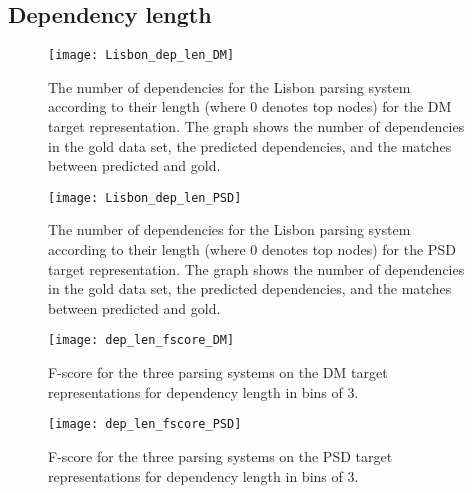 
\subsection{Dependency length}

\begin{figure}[h]
    \centering
    \begin{minipage}{0.8\textwidth}
        \centering
        \texttt{[image: Lisbon\_dep\_len\_DM]}
    \end{minipage}\hfill
    \caption{The number of dependencies for the Lisbon parsing system according to their length (where 0 denotes top nodes) for the DM target representation. The graph shows the number of dependencies in the gold data set, the predicted dependencies, and the matches between predicted and gold.}
    \label{fig:Lisbon_dep_len_DM}
\end{figure}

\begin{figure}[h]
    \centering
    \begin{minipage}{0.8\textwidth}
        \centering
        \texttt{[image: Lisbon\_dep\_len\_PSD]}
    \end{minipage}
    \caption{The number of dependencies for the Lisbon parsing system according to their length (where 0 denotes top nodes) for the PSD target representation. The graph shows the number of dependencies in the gold data set, the predicted dependencies, and the matches between predicted and gold.}
    \label{fig:Lisbon_dep_len_PSD}
\end{figure}

\begin{figure}[h]
    \centering
    \begin{minipage}{0.8\textwidth}
        \centering
        \texttt{[image: dep\_len\_fscore\_DM]}
    \end{minipage}\hfill
    \caption{F-score for the three parsing systems on the DM target representations for dependency length in bins of 3.}
    \label{fig:dep_len_fscore_DM}
\end{figure}

\begin{figure}[h]
    \centering
    \begin{minipage}{0.8\textwidth}
        \centering
        \texttt{[image: dep\_len\_fscore\_PSD]}
    \end{minipage}
    \caption{F-score for the three parsing systems on the PSD target representations for dependency length in bins of 3.}
    \label{fig:dep_len_fscore_PSD}
\end{figure}

